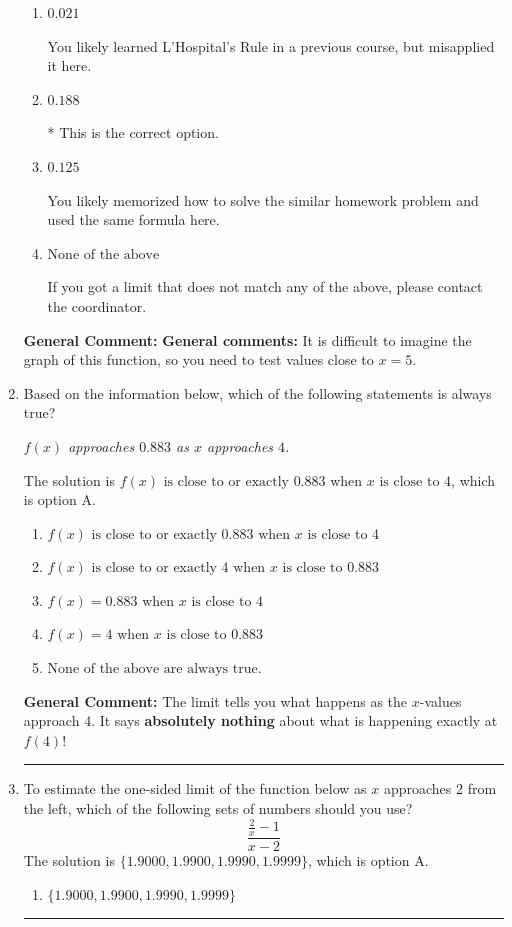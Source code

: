 \documentclass{extbook}[14pt]
\newcommand{\litem}[1]{\item #1

\rule{\textwidth}{0.4pt}}
\begin{document}
\begin{enumerate}
{\begin{enumerate}[label=\Alph*.]
You likely believed that since the denominator is equal to 0, the limit is infinity.
\item \( 0.021 \)

You likely learned L'Hospital's Rule in a previous course, but misapplied it here.
\item \( 0.188 \)

* This is the correct option.
\item \( 0.125 \)

You likely memorized how to solve the similar homework problem and used the same formula here.
\item \( \text{None of the above} \)

If you got a limit that does not match any of the above, please contact the coordinator.
\end{enumerate}

\textbf{General Comment:} \textbf{General comments:} It is difficult to imagine the graph of this function, so you need to test values close to $x = 5$.
}
\litem{
Based on the information below, which of the following statements is always true?

\begin{center}
    \textit{ $f(x)$ approaches $0.883$ as $x$ approaches $4$. }
\end{center}
The solution is \( f(x) \text{ is close to or exactly } 0.883 \text{ when } x \text{ is close to } 4 \), which is option A.\begin{enumerate}[label=\Alph*.]
\item \( f(x) \text{ is close to or exactly } 0.883 \text{ when } x \text{ is close to } 4 \)


\item \( f(x) \text{ is close to or exactly } 4 \text{ when } x \text{ is close to } 0.883 \)


\item \( f(x) = 0.883 \text{ when } x \text{ is close to } 4 \)


\item \( f(x) = 4 \text{ when } x \text{ is close to } 0.883 \)


\item \( \text{None of the above are always true.} \)


\end{enumerate}

\textbf{General Comment:} The limit tells you what happens as the $x$-values approach $4$. It says \textbf{absolutely nothing} about what is happening exactly at $f(4)$!
}
\litem{
To estimate the one-sided limit of the function below as $x$ approaches 2 from the left, which of the following sets of numbers should you use?
\[ \frac{\frac{2}{x} - 1}{x - 2} \]The solution is \( \{ 1.9000, 1.9900, 1.9990, 1.9999 \} \), which is option A.\begin{enumerate}[label=\Alph*.]
\item \( \{ 1.9000, 1.9900, 1.9990, 1.9999 \} \)


\end{enumerate}}
\end{enumerate}
\end{document}
